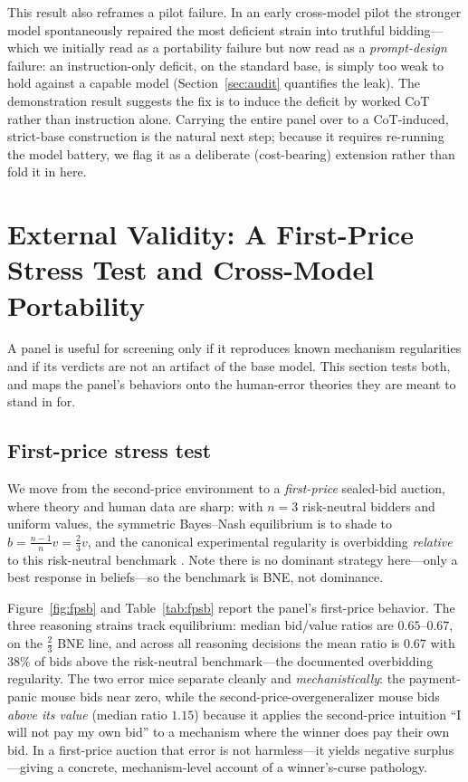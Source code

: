 \documentclass[12pt]{article}
\begin{document}
This result also reframes a pilot failure. In an early cross-model pilot the
stronger model spontaneously repaired the most deficient strain into truthful
bidding---which we initially read as a portability failure but now read as a
\emph{prompt-design} failure: an instruction-only deficit, on the standard base, is
simply too weak to hold against a capable model (Section~\ref{sec:audit} quantifies
the leak). The demonstration result suggests the fix is to induce the deficit by
worked CoT rather than instruction alone. Carrying the entire panel over to a
CoT-induced, strict-base construction is the natural next step; because it requires
re-running the model battery, we flag it as a deliberate (cost-bearing) extension
rather than fold it in here.

\section{External Validity: A First-Price Stress Test and Cross-Model Portability}
\label{sec:external}

A panel is useful for screening only if it reproduces known mechanism regularities
and if its verdicts are not an artifact of the base model. This section tests both,
and maps the panel's behaviors onto the human-error theories they are meant to
stand in for.

\subsection{First-price stress test}

We move from the second-price environment to a \emph{first-price} sealed-bid
auction, where theory and human data are sharp: with $n=3$ risk-neutral bidders and
uniform values, the symmetric Bayes--Nash equilibrium is to shade to
$b=\frac{n-1}{n}v=\frac{2}{3}v$, and the canonical experimental regularity is
overbidding \emph{relative} to this risk-neutral benchmark \citep{kagellevin1993}.
Note there is no dominant strategy here---only a best response in beliefs---so the
benchmark is BNE, not dominance.

Figure~\ref{fig:fpsb} and Table~\ref{tab:fpsb} report the panel's first-price
behavior. The three reasoning strains track equilibrium: median bid/value ratios
are $0.65$--$0.67$, on the $\frac23$ BNE line, and across all reasoning decisions
the mean ratio is $0.67$ with $38\%$ of bids above the risk-neutral
benchmark---the documented overbidding regularity. The two error mice separate
cleanly and \emph{mechanistically}: the payment-panic mouse bids near zero, while
the second-price-overgeneralizer mouse bids \emph{above its value} (median ratio
$1.15$) because it applies the second-price intuition ``I will not pay my own bid''
to a mechanism where the winner does pay their own bid. In a first-price auction
that error is not harmless---it yields negative surplus---giving a concrete,
mechanism-level account of a winner's-curse pathology.
\end{document}
